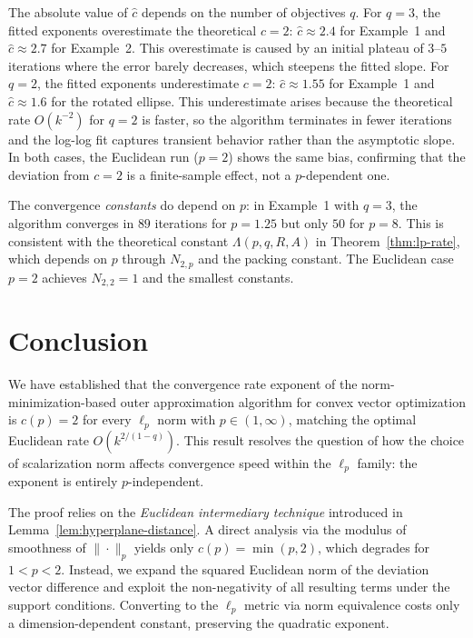 \documentclass[11pt]{article}
\begin{document}
The absolute value of $\hat{c}$ depends on the number of objectives $q$. For $q = 3$, the fitted exponents overestimate the theoretical $c = 2$: $\hat{c} \approx 2.4$ for Example~1 and $\hat{c} \approx 2.7$ for Example~2. This overestimate is caused by an initial plateau of $3$--$5$ iterations where the error barely decreases, which steepens the fitted slope. For $q = 2$, the fitted exponents underestimate $c = 2$: $\hat{c} \approx 1.55$ for Example~1 and $\hat{c} \approx 1.6$ for the rotated ellipse. This underestimate arises because the theoretical rate $O(k^{-2})$ for $q = 2$ is faster, so the algorithm terminates in fewer iterations and the log-log fit captures transient behavior rather than the asymptotic slope. In both cases, the Euclidean run ($p = 2$) shows the same bias, confirming that the deviation from $c = 2$ is a finite-sample effect, not a $p$-dependent one.

The convergence \emph{constants} do depend on $p$: in Example~1 with $q = 3$, the algorithm converges in $89$ iterations for $p = 1.25$ but only $50$ for $p = 8$. This is consistent with the theoretical constant $\Lambda(p,q,R,A)$ in Theorem~\ref{thm:lp-rate}, which depends on $p$ through $N_{2,p}$ and the packing constant. The Euclidean case $p = 2$ achieves $N_{2,2} = 1$ and the smallest constants.

\section{Conclusion}\label{sec:conclusion}

We have established that the convergence rate exponent of the norm-minimization-based outer approximation algorithm for convex vector optimization is $c(p) = 2$ for every $\ell_p$ norm with $p \in (1,\infty)$, matching the optimal Euclidean rate $O(k^{2/(1-q)})$. This result resolves the question of how the choice of scalarization norm affects convergence speed within the $\ell_p$ family: the exponent is entirely $p$-independent.

The proof relies on the \emph{Euclidean intermediary technique} introduced in Lemma~\ref{lem:hyperplane-distance}. A direct analysis via the modulus of smoothness of $\|\cdot\|_p$ yields only $c(p) = \min(p,2)$, which degrades for $1 < p < 2$. Instead, we expand the squared Euclidean norm of the deviation vector difference and exploit the non-negativity of all resulting terms under the support conditions. Converting to the $\ell_p$ metric via norm equivalence costs only a dimension-dependent constant, preserving the quadratic exponent.
\end{document}
